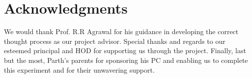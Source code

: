 


\thispagestyle{empty}
\pagestyle{empty}



\chapter*{Acknowledgments}
\vspace{0.2in}
\hspace{0.9cm} We would thank Prof. R.R Agrawal for his
guidance in developing the correct thought process as our
project advisor. Special thanks and regards to our esteemed principal and HOD for supporting us through the project. Finally, last but the most, Parth's parents
for sponsoring his PC and enabling us to complete this
experiment and for their unwavering support.


